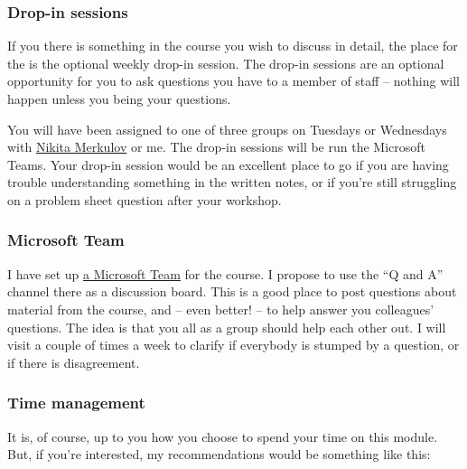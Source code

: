 \documentclass[
  a4paper,
]{article}
\theoremstyle{definition}
\theoremstyle{definition}
\theoremstyle{definition}
\theoremstyle{remark}
\begin{document}
\hypertarget{dropin}{%
\subsubsection*{Drop-in sessions}\label{dropin}}

If you there is something in the course you wish to discuss in detail, the place for the is the optional weekly drop-in session. The drop-in sessions are an optional opportunity for you to ask questions you have to a member of staff -- nothing will happen unless you being your questions.

You will have been assigned to one of three groups on Tuesdays or Wednesdays with \href{https://eps.leeds.ac.uk/maths/pgr/4992/nikita-merkulov}{Nikita Merkulov} or me. The drop-in sessions will be run the Microsoft Teams. Your drop-in session would be an excellent place to go if you are having trouble understanding something in the written notes, or if you're still struggling on a problem sheet question after your workshop.

\hypertarget{team}{%
\subsubsection*{Microsoft Team}\label{team}}

I have set up \href{https://teams.microsoft.com/l/channel/19\%3a8cb8008c95204bbeaefa8ee7d48c1a13\%40thread.tacv2/General?groupId=1c138eac-0c54-43b0-9d20-d4cf3d65c40a\&tenantId=bdeaeda8-c81d-45ce-863e-5232a535b7cb}{a Microsoft Team} for the course. I propose to use the ``Q and A'' channel there as a discussion board. This is a good place to post questions about material from the course, and -- even better! -- to help answer you colleagues' questions. The idea is that you all as a group should help each other out. I will visit a couple of times a week to clarify if everybody is stumped by a question, or if there is disagreement.

\hypertarget{time}{%
\subsubsection*{Time management}\label{time}}

It is, of course, up to you how you choose to spend your time on this module. But, if you're interested, my recommendations would be something like this:
\end{document}
